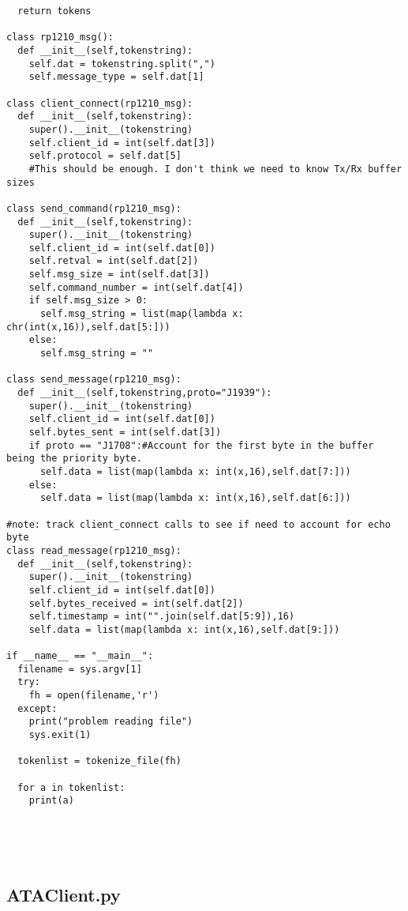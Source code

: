 \begin{appendices}
\begin{verbatim}
  return tokens
  
class rp1210_msg():
  def __init__(self,tokenstring):
    self.dat = tokenstring.split(",")
    self.message_type = self.dat[1]
    
class client_connect(rp1210_msg):
  def __init__(self,tokenstring):
    super().__init__(tokenstring)
    self.client_id = int(self.dat[3])
    self.protocol = self.dat[5]
    #This should be enough. I don't think we need to know Tx/Rx buffer sizes 
    
class send_command(rp1210_msg):
  def __init__(self,tokenstring):
    super().__init__(tokenstring)
    self.client_id = int(self.dat[0])
    self.retval = int(self.dat[2])
    self.msg_size = int(self.dat[3])
    self.command_number = int(self.dat[4])
    if self.msg_size > 0:
      self.msg_string = list(map(lambda x: chr(int(x,16)),self.dat[5:]))
    else:
      self.msg_string = ""
    
class send_message(rp1210_msg):
  def __init__(self,tokenstring,proto="J1939"):
    super().__init__(tokenstring)
    self.client_id = int(self.dat[0])
    self.bytes_sent = int(self.dat[3])
    if proto == "J1708":#Account for the first byte in the buffer being the priority byte.
      self.data = list(map(lambda x: int(x,16),self.dat[7:]))
    else:
      self.data = list(map(lambda x: int(x,16),self.dat[6:]))
    
#note: track client_connect calls to see if need to account for echo byte
class read_message(rp1210_msg):
  def __init__(self,tokenstring):
    super().__init__(tokenstring)
    self.client_id = int(self.dat[0])
    self.bytes_received = int(self.dat[2])
    self.timestamp = int("".join(self.dat[5:9]),16)
    self.data = list(map(lambda x: int(x,16),self.dat[9:]))
  
if __name__ == "__main__":
  filename = sys.argv[1]
  try:
    fh = open(filename,'r')
  except:
    print("problem reading file")
    sys.exit(1)
    
  tokenlist = tokenize_file(fh)
      
  for a in tokenlist:
    print(a)
    




\end{verbatim}

\subsection{ATAClient.py}
\begin{verbatim}


\end{verbatim}
\end{appendices}
